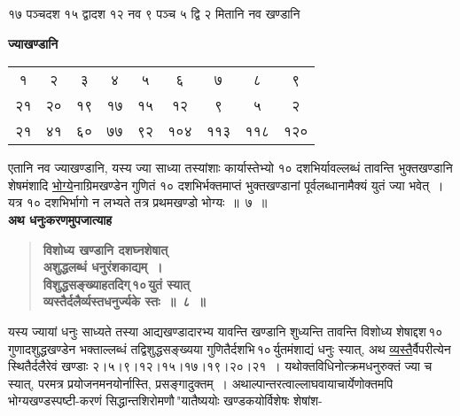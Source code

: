 \documentclass[11pt, openany]{book}
\begin{document}
\begin{sloppypar}
\noindent १७ पञ्चदश १५ द्वादश १२ नव ९ पञ्च ५ द्वि २ मितानि नव खण्डानि\textendash 

\begin{center}
{\large \textbf{ज्याखण्डानि}} 
\vspace{4mm}

\begin{tabular}{ccccccccc}
१ & २ & ३ & ४ & ५ & ६ & ७ & ८ & ९\\
२१ & २० & १९ & १७ & १५ & १२ & ९ & ५ & २\\
२१ & ४१ & ६० & ७७ & ९२ & १०४ & ११३ & ११८ & १२०
\end{tabular}
\end{center}
\vspace{1mm}

एतानि नव ज्याखण्डानि, यस्य ज्या साध्या तस्यांशाः कार्यास्तेभ्यो १० दशभिर्यावल्लब्धं तावन्ति भुक्तखण्डानि शेषमंशादि \hyperref[2.6]{भोग्ये}नाग्रिमखण्डेन गुणितं १० दशभिर्भक्तमाप्तं भुक्तखण्डानां पूर्वलब्धानामैक्यं युतं ज्या भवेत्~। यत्र १० दशभिर्भागो न लभ्यते तत्र प्रथमखण्डो भोग्यः~॥~७~॥\\

{\small \textbf{अथ धनुःकरणमुपजात्याह\textendash }}

 \label{2.8}
\begin{quote}
{\large \textbf{{\color{purple}विशोध्य खण्डानि दशघ्नशेषात् \\
अशुद्धलब्धं धनुरंशकाद्यम्~। \\
विशुद्धसङ्ख्याहतदिग्\textendash \,१०\textendash \,युतं स्यात् \\
व्यस्तैर्दलैर्व्यस्तधनुर्ज्यके स्तः~॥~८~॥}}}
\end{quote}

यस्य ज्यायां धनुः साध्यते तस्या आद्यखण्डादारभ्य यावन्ति खण्डानि शुध्यन्ति तावन्ति विशोध्य शेषाद्दश\textendash \,१०\textendash \,गुणादशुद्धखण्डेन भक्ताल्लब्धं तद्विशुद्धसङ्ख्यया गुणितैर्दशभि\textendash \,१०\textendash \,र्युतमंशाद्यं धनुः स्यात्, अथ \hyperref[2.8]{व्यस्तै}र्वैपरीत्येन स्थितैर्दलैरेवं खण्डाः २।५।९।१२।१५।१७।१९।२०।२१~। यथोक्तविधिनोत्क्रमधनुरुक्तं ज्या च स्यात्, परमत्र प्रयोजनमनयोर्नास्ति, प्रसङ्गादुक्तम्~। अथाल्पान्तरत्वाल्लाघवायाचार्येणोक्तमपि भोग्यखण्डस्पष्टी-करणं {\color{violet}सिद्धान्तशिरोमणौ\textendash \,"यातैष्ययोः खण्डकयोर्विशेषः शेषांश-}
\end{sloppypar}

\newpage
\end{document}

